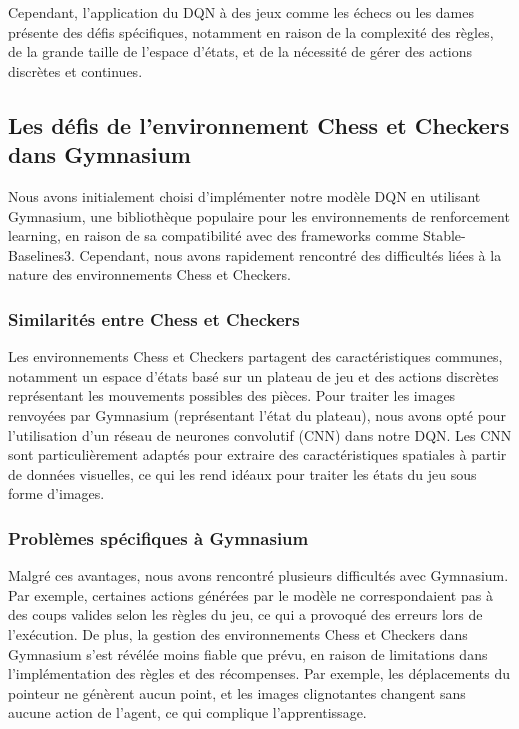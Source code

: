 \documentclass{article}
\begin{document}
Cependant, l'application du DQN à des jeux comme les échecs ou les dames présente des défis spécifiques, notamment en raison de la complexité des règles, de la grande taille de l'espace d'états, et de la nécessité de gérer des actions discrètes et continues.

\subsection{Les défis de l'environnement Chess et Checkers dans Gymnasium}

\quad Nous avons initialement choisi d'implémenter notre modèle DQN en utilisant Gymnasium, une bibliothèque populaire pour les environnements de renforcement learning, en raison de sa compatibilité avec des frameworks comme Stable-Baselines3. Cependant, nous avons rapidement rencontré des difficultés liées à la nature des environnements Chess et Checkers.

    \subsubsection{Similarités entre Chess et Checkers}

    \quad Les environnements Chess et Checkers partagent des caractéristiques communes, notamment un espace d'états basé sur un plateau de jeu et des actions discrètes représentant les mouvements possibles des pièces. Pour traiter les images renvoyées par Gymnasium (représentant l'état du plateau), nous avons opté pour l'utilisation d'un réseau de neurones convolutif (CNN) dans notre DQN. Les CNN sont particulièrement adaptés pour extraire des caractéristiques spatiales à partir de données visuelles, ce qui les rend idéaux pour traiter les états du jeu sous forme d'images.

    \subsubsection{Problèmes spécifiques à Gymnasium}

    \quad Malgré ces avantages, nous avons rencontré plusieurs difficultés avec Gymnasium. Par exemple, certaines actions générées par le modèle ne correspondaient pas à des coups valides selon les règles du jeu, ce qui a provoqué des erreurs lors de l'exécution. De plus, la gestion des environnements Chess et Checkers dans Gymnasium s'est révélée moins fiable que prévu, en raison de limitations dans l'implémentation des règles et des récompenses. Par exemple, les déplacements du pointeur ne génèrent aucun point, et les images clignotantes changent sans aucune action de l'agent, ce qui complique l'apprentissage.
\end{document}

